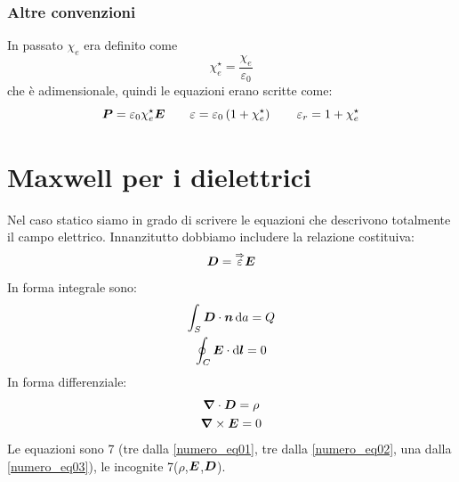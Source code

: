 \subsubsection{Altre convenzioni}
In passato $\chi_e$ era definito come
\begin{equation}
  \chi_e^\star=\frac{\chi_e}{\varepsilon_0}
\end{equation}
che è adimensionale, quindi le equazioni erano scritte come:
\[
  \boldsymbol{P}=\varepsilon_0\chi_e^\star\boldsymbol{E}\qquad\varepsilon=\varepsilon_0\left(1+\chi_e^\star\right)\qquad\varepsilon_r=1+\chi_e^\star\]
\section{Maxwell per i dielettrici}
Nel caso statico siamo in grado di scrivere le equazioni che descrivono totalmente il campo elettrico. Innanzitutto dobbiamo includere la relazione costituiva:
\begin{equation}
  \boldsymbol{D}=\overset{\Rightarrow}{\varepsilon}\boldsymbol{E}
  \label{numero_eq01}
\end{equation}
In forma integrale sono:
\begin{gather}
  \int_S\boldsymbol{D}\cdot\boldsymbol{n}\,\mathrm{d} a=Q\\
  \oint_C\boldsymbol{E}\cdot\mathrm{d}\boldsymbol{l}=0
\end{gather}
In forma differenziale:
\begin{gather}
  \label{numero_eq03}
  \boldsymbol{\nabla}\cdot\boldsymbol{D}=\rho\\
  \label{numero_eq02}
  \boldsymbol{\nabla}\times\boldsymbol{E}=0
\end{gather}
Le equazioni sono 7 (tre dalla \eqref{numero_eq01}, tre dalla \eqref{numero_eq02}, una dalla \eqref{numero_eq03}), le incognite 7($\rho$,$\boldsymbol{E}$,$\boldsymbol{D}$).
